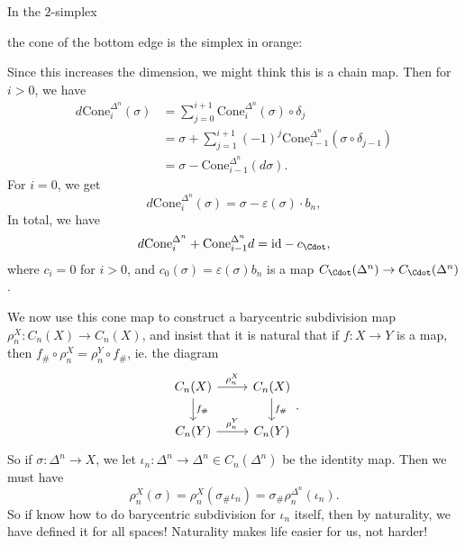 \documentclass[a4paper]{article}
\begin{document}
\begin{eg}
  In the $2$-simplex
  \begin{center}
  \end{center}
  the cone of the bottom edge is the simplex in orange:
  \begin{center}
  \end{center}

\end{eg}
Since this increases the dimension, we might think this is a chain map. Then for $i > 0$, we have
\begin{align*}
  d \mathrm{Cone}_i^{\Delta^n}(\sigma) &= \sum_{j = 0}^{i + 1} \mathrm{Cone}_i^{\Delta^n}(\sigma) \circ \delta_j \\
  &= \sigma + \sum_{j = 1}^{i + 1} (-1)^j \mathrm{Cone}_{i - 1}^{\Delta^n} (\sigma \circ \delta_{j - 1})\\
  &= \sigma - \mathrm{Cone}_{i - 1}^{\Delta^n} (d \sigma).
\end{align*}
For $i = 0$, we get
\[
  d \mathrm{Cone}_i^{\Delta^n}(\sigma) = \sigma - \varepsilon(\sigma) \cdot b_n,
\]
In total, we have
\[
  d \mathrm{Cone}_i^{\Delta^n} + \mathrm{Cone}_{i - 1}^{\Delta^n} d = \mathrm{id} - c_{\Cdot},
\]
where $c_i = 0$ for $i > 0$, and $c_0(\sigma) = \varepsilon(\sigma) b_n$ is a map $C_\Cdot(\Delta^n) \to C_\Cdot(\Delta^n)$.

We now use this cone map to construct a barycentric subdivision map $\rho_n^X: C_n(X) \to C_n(X)$, and insist that it is natural that if $f: X \to Y$ is a map, then $f_\# \circ \rho_n^X = \rho_n^Y \circ f_\#$, ie. the diagram
\[
  \begin{tikzcd}
    C_n(X) \ar[r, "\rho_n^X"] \ar[d, "f_\#"] & C_n(X) \ar[d, "f_\#"]\\
    C_n(Y) \ar[r, "\rho_n^Y"] & C_n(Y)
  \end{tikzcd}.
\]
So if $\sigma: \Delta^n \to X$, we let $\iota_n: \Delta^n \to \Delta^n \in C_n(\Delta^n)$ be the identity map. Then we must have
\[
  \rho_n^X (\sigma) = \rho_n^X (\sigma_\# \iota_n) = \sigma_\# \rho_n^{\Delta^n}(\iota_n).
\]
So if know how to do barycentric subdivision for $\iota_n$ itself, then by naturality, we have defined it for all spaces! Naturality makes life easier for us, not harder!
\end{document}
